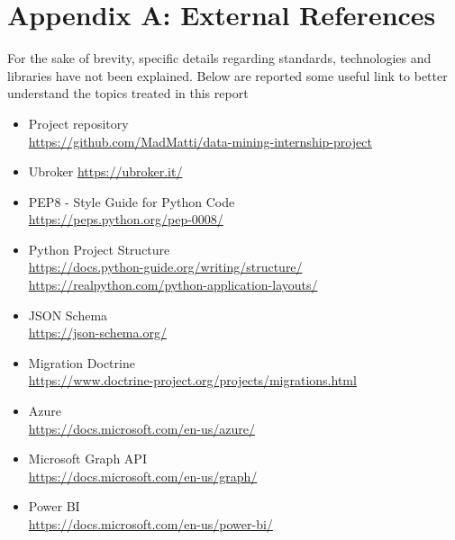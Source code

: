 \documentclass[12pt, a4paper, oneside]{article}
\begin{document}
\section{Appendix A: External References}
For the sake of brevity, specific details regarding standards, technologies and libraries have not been explained. Below are reported some useful link to better understand the topics treated in this report
\begin{itemize}
    \item Project repository\\
    \url{https://github.com/MadMatti/data-mining-internship-project}
    \item Ubroker
    \url{https://ubroker.it/}
    \item PEP8 - Style Guide for Python Code\\
    \url{https://peps.python.org/pep-0008/}
    \item Python Project Structure\\
    \url{https://docs.python-guide.org/writing/structure/}\\
    \url{https://realpython.com/python-application-layouts/}
    \item JSON Schema\\
    \url{https://json-schema.org/}
    \item Migration Doctrine\\
    \url{https://www.doctrine-project.org/projects/migrations.html}
    \item Azure\\
    \url{https://docs.microsoft.com/en-us/azure/}
    \item Microsoft Graph API\\
    \url{https://docs.microsoft.com/en-us/graph/}
    \item Power BI\\
    \url{https://docs.microsoft.com/en-us/power-bi/}
\end{itemize}
\end{document}
